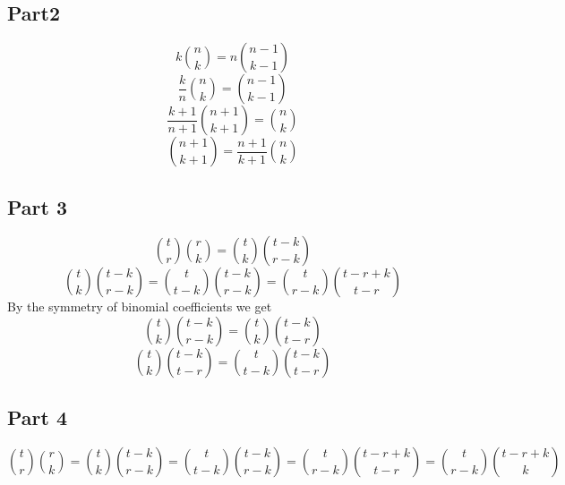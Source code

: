 \subsection{Part2}\label{subsec:part2}
\begin{equation}
    k \binom{n}{k} = n \binom{n-1}{k-1}
\end{equation}
\begin{equation}
    \frac{k}{n} \binom{n}{k} = \binom{n-1}{k-1}
\end{equation}
\begin{equation}
    \frac{k+1}{n+1} \binom{n+1}{k+1} = \binom{n}{k}
\end{equation}
\begin{equation}
    \binom{n+1}{k+1} = \frac{n+1}{k+1} \binom{n}{k}
\end{equation}

\subsection{Part 3}\label{subsec:part-3}
\begin{equation}
    \binom{t}{r} \binom{r}{k} = \binom{t}{k} \binom{t-k}{r-k}
\end{equation}
\begin{equation}
    \binom{t}{k} \binom{t-k}{r-k} = \binom{t}{t-k} \binom{t-k}{r-k} = \binom{t}{r-k} \binom{t-r+k}{t-r}
\end{equation}
By the symmetry of binomial coefficients we get
\begin{equation}
    \binom{t}{k} \binom{t-k}{r-k} = \binom{t}{k} \binom{t-k}{t-r}
\end{equation}
\begin{equation}
    \binom{t}{k} \binom{t-k}{t-r} = \binom{t}{t-k} \binom{t-k}{t-r}
\end{equation}
\subsection{Part 4}\label{subsec:part-4}
\begin{equation}
    \binom{t}{r} \binom{r}{k} = \binom{t}{k} \binom{t-k}{r-k} = \binom{t}{t-k} \binom{t-k}{r-k} = \binom{t}{r-k} \binom{t-r+k}{t-r} = \binom{t}{r-k} \binom{t-r+k}{k}
\end{equation}
